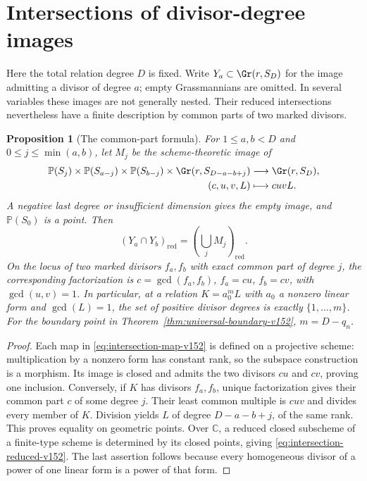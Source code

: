 \documentclass[11pt,reqno]{amsart}
\numberwithin{equation}{section}
\newtheorem{proposition}[theorem]{Proposition}
\theoremstyle{definition}\newtheorem{definition}[theorem]{Definition}
\theoremstyle{remark}\newtheorem{remark}[theorem]{Remark}
\newcommand{\C}{\mathbb C}\newcommand{\Q}{\mathbb Q}
\newcommand{\Pj}{\mathbb P}\newcommand{\A}{\mathbb A}
\begin{document}
\section{Intersections of divisor-degree images}
\label{sec:degree-intersections-v152}

Here the total relation degree $D$ is fixed.  Write $Y_a\subset
\Gr(r,S_D)$ for the image admitting a divisor of degree $a$;
empty Grassmannians are omitted.  In several variables these images
are not generally nested.  Their reduced intersections nevertheless
have a finite description by common parts of two marked divisors.

\begin{proposition}[The common-part formula]
\label{prop:degree-intersections-v152}
For $1\leq a,b<D$ and $0\leq j\leq\min(a,b)$, let $M_j$ be the
scheme-theoretic image of
\begin{equation}\label{eq:intersection-map-v152}
\begin{split}
 \Pj(S_j)\times\Pj(S_{a-j})\times\Pj(S_{b-j})
       \times\Gr(r,S_{D-a-b+j})&\longrightarrow\Gr(r,S_D),\\
                   (c,u,v,L)&\longmapsto cuvL.
\end{split}
\end{equation}
A negative last degree or insufficient dimension gives the empty
image, and $\Pj(S_0)$ is a point.  Then
\begin{equation}\label{eq:intersection-reduced-v152}
             (Y_a\cap Y_b)_{\mathrm{red}}
                         =\left(\bigcup_j M_j\right)_{\mathrm{red}}.
\end{equation}
On the locus of two marked divisors $f_a,f_b$ with exact common
part of degree $j$, the corresponding factorization is
$c=\gcd(f_a,f_b)$, $f_a=cu$, $f_b=cv$, with $\gcd(u,v)=1$.
In particular, at a relation $K=a_0^mL$ with $a_0$ a nonzero
linear form and $\gcd(L)=1$, the
set of positive divisor degrees is exactly $\{1,\ldots,m\}$.
For the boundary point in Theorem~\ref{thm:universal-boundary-v152},
$m=D-q_n$.
\end{proposition}
\begin{proof}
Each map in \eqref{eq:intersection-map-v152} is defined on a
projective scheme: multiplication by a nonzero form has constant
rank, so the subspace construction is a morphism.  Its image is
closed and admits the two divisors $cu$ and $cv$, proving one
inclusion.  Conversely, if $K$ has divisors $f_a,f_b$, unique
factorization gives their common part $c$ of some degree $j$.
Their least common multiple is $cuv$ and divides every member of
$K$.  Division yields $L$ of degree $D-a-b+j$, of the same rank.
This proves equality on geometric points.  Over $\C$, a reduced
closed subscheme of a finite-type scheme is determined by its closed
points, giving \eqref{eq:intersection-reduced-v152}.  The last
assertion follows because every homogeneous divisor of a power
of one linear form is a power of that form.
\end{proof}
\end{document}
